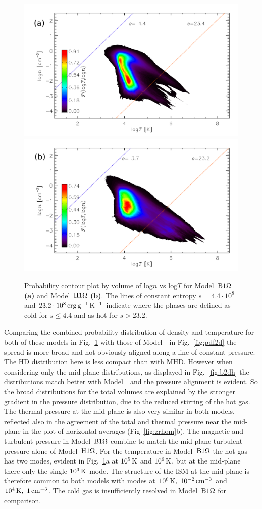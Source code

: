   \begin{figure}[h]
  \centering
  \includegraphics[width=0.475\linewidth]{fig/o1pr_pdf2dtn.png}  
  \includegraphics[width=0.475\linewidth]{fig/o1ph_pdf2dtn.png}
    \caption[2D probability distribution of $n$ and $T$ for Models~$\Ompa$ and $\Omph$]{
  Probability contour plot by volume of log$n$ vs log$T$ for Model~$\Ompa$
  {\textbf{(a)}}
  and Model~$\Omph$ {\textbf{(b)}}.
  The lines of constant entropy $s=4.4\cdot10^{8}$ 
  and $23.2\cdot10^{8}\,{\rm erg}\,{\rm g}^{-1}\,{\rm K}^{-1}$ indicate where the phases are defined
  as cold for $s\le4.4$ and as hot for $s>23.2$. 
  \label{fig:b2dv}
    }
  \end{figure}

  Comparing the combined probability distribution of density and temperature
  for both of these models in Fig.~\ref{fig:b2dv} with those of Model~\Op\
  in Fig.~\ref{fig:pdf2d} the spread is more broad and not obviously 
  aligned along a line of constant pressure.
  The HD distribution here is less compact than with MHD. 
  However when considering only the mid-plane distributions, as displayed in
  Fig.~\ref{fig:b2dh} the distributions match better with Model~\Op\ and the 
  pressure alignment is evident.
  So the broad distributions for the total volumes are explained by the 
  stronger gradient in the pressure distribution, due to the reduced 
  stirring of the hot gas.
  The thermal pressure at the mid-plane is also very similar in both models,
  reflected also in the agreement of the total and thermal pressure near the
  mid-plane in the plot of horizontal averages (Fig~\ref{fig:zrhom}b).
  The magnetic and turbulent pressure in Model~$\Ompa$ combine to match the
  mid-plane turbulent pressure alone of Model~$\Omph$.
  For the temperature in Model~$\Ompa$ the hot gas has two modes, evident in 
  Fig.~\ref{fig:b2dv}a at $10^5\,{\rm K}$ and $10^6\,{\rm K}$, but at the mid-plane there 
  only the single $10^3\,{\rm K}$ mode. 
  The structure of the ISM at the mid-plane is therefore common to both models
  with modes at $10^6\,{\rm K},~10^{-2}\,{\rm cm^{-3}}$ and $10^4\,{\rm K},~1\,{\rm cm^{-3}}$.
  The cold gas is insufficiently resolved in Model~$\Ompa$ for comparison. 
  

